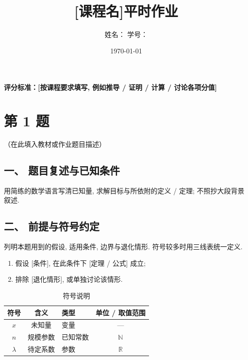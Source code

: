 \documentclass[11pt,a4paper,UTF8]{ctexart}
\title{\LARGE\textbf{[课程名]平时作业}}
\author{\large 姓名：\underline{\hspace{3.5cm}} \qquad 学号：\underline{\hspace{3.5cm}}}
\date{\today}
\begin{document}
\maketitle

\begin{center}
\textbf{评分标准：[按课程要求填写, 例如推导 / 证明 / 计算 / 讨论各项分值]}
\end{center}
\vspace{0.5cm}

\section*{第 1 题}

\begin{tcolorbox}[title=\textbf{题目内容},colback=blue!5!white,colframe=blue!75!black,arc=2mm]
（在此填入教材或作业题目描述）
\end{tcolorbox}

\subsection*{一、 题目复述与已知条件}
用简练的数学语言写清已知量, 求解目标与所依附的定义 / 定理; 不照抄大段背景叙述.

\subsection*{二、 前提与符号约定}
列明本题用到的假设, 适用条件, 边界与退化情形. 符号较多时用三线表统一定义.
\begin{enumerate}[label=(\arabic*)]
    \item 假设 [条件], 在此条件下 [定理 / 公式] 成立;
    \item 排除 [退化情形], 或单独讨论该情形.
\end{enumerate}

\begin{table}[htbp]
\centering
\caption{符号说明}
\vspace{1mm}
\begin{tabular}{cclc}
\toprule
符号 & 含义 & 类型 & 单位 / 取值范围 \\
\midrule
$x$ & 未知量 & 变量 & --- \\
$n$ & 规模参数 & 已知常数 & $\mathbb{N}$ \\
$\lambda$ & 待定系数 & 参数 & $\mathbb{R}$ \\
\bottomrule
\end{tabular}
\end{table}
\end{document}
